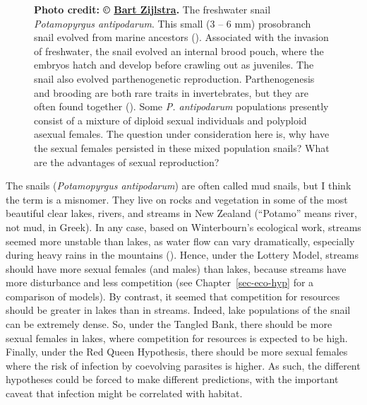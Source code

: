 \documentclass[
  letterpaper,
]{book}
\begin{document}
\begin{figure}


\caption[The freshwater snail \emph{Potamopyrgus
antipodarum}]{\label{fig-3-4}\textbf{Photo credit: ©
\href{https://www.bartzijlstra.com}{Bart Zijlstra}.} The freshwater
snail \emph{Potamopyrgus antipodarum}. This small (3 -- 6 mm)
prosobranch snail evolved from marine ancestors
(). Associated
with the invasion of freshwater, the snail evolved an internal brood
pouch, where the embryos hatch and develop before crawling out as
juveniles. The snail also evolved parthenogenetic reproduction.
Parthenogenesis and brooding are both rare traits in invertebrates, but
they are often found together (). Some \emph{P. antipodarum} populations presently consist
of a mixture of diploid sexual individuals and polyploid asexual
females. The question under consideration here is, why have the sexual
females persisted in these mixed population snails? What are the
advantages of sexual reproduction?}

\end{figure}%

The snails (\emph{Potamopyrgus antipodarum}) are often called mud
snails, but I think the term is a misnomer. They live on rocks and
vegetation in some of the most beautiful clear lakes, rivers, and
streams in New Zealand (``Potamo'' means river, not mud, in Greek). In
any case, based on Winterbourn's ecological work, streams seemed more
unstable than lakes, as water flow can vary dramatically, especially
during heavy rains in the mountains
().
Hence, under the Lottery Model, streams should have more sexual females
(and males) than lakes, because streams have more disturbance and less
competition (see Chapter~\ref{sec-eco-hyp} for a comparison of models).
By contrast, it seemed that competition for resources should be greater
in lakes than in streams. Indeed, lake populations of the snail can be
extremely dense. So, under the Tangled Bank, there should be more sexual
females in lakes, where competition for resources is expected to be
high. Finally, under the Red Queen Hypothesis, there should be more
sexual females where the risk of infection by coevolving parasites is
higher. As such, the different hypotheses could be forced to make
different predictions, with the important caveat that infection might be
correlated with habitat.
\end{document}
